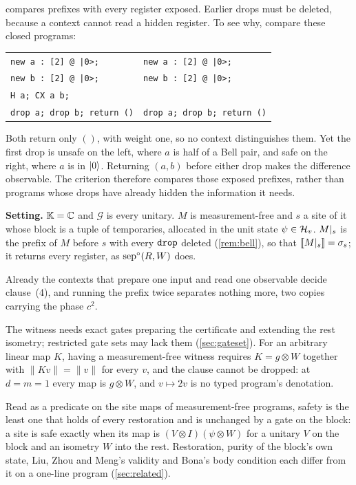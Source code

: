 \documentclass[acmsmall,screen,review,anonymous,nonacm]{acmart}
\begin{document}
\begin{remark}\label{rem:bell}
 compares prefixes with every register exposed.
Earlier drops must be deleted, because a context cannot read a hidden
register. To see why, compare these closed programs:
\begin{center}\small
\begin{tabular}{@{}l@{\qquad}l@{}}
\texttt{new a : [2] @ |0>;} & \texttt{new a : [2] @ |0>;}\\
\texttt{new b : [2] @ |0>;} & \texttt{new b : [2] @ |0>;}\\
\texttt{H a; CX a b;} & \\
\texttt{drop a; drop b; return ()} & \texttt{drop a; drop b; return ()}
\end{tabular}
\end{center}
Both return only $()$, with weight one, so no context distinguishes them.
Yet the first drop is unsafe on the left, where $a$ is half of a Bell
pair, and safe on the right, where $a$ is in $\lvert 0 \rangle$.
Returning $(a,b)$ before either drop makes the difference observable.
The criterion therefore compares those exposed prefixes, rather than
programs whose drops have already hidden the information it needs.
\end{remark}

\textbf{Setting.} $\mathbb{K} = \mathbb{C}$ and $\mathcal G$ is every unitary. $M$
is measurement-free and $s$ a site of it whose block is a tuple of
temporaries, allocated in the unit state $\psi \in \mathcal{H}_{v}$. $M|_{s}$ is the
prefix of $M$ before $s$ with every $\texttt{drop}$ deleted (\cref{rem:bell}), so that
$[\![M|_{s}]\!] = \sigma_s$; it returns every register, as
$\mathrm{sep}^{\circ}(R,W)$ does.

\stmtPhase

\stmtCriterion

Already the contexts that prepare one input and read one observable decide
clause~(4), and running the prefix twice separates nothing more, two copies
carrying the phase $c^{2}$.

The witness needs exact gates preparing the certificate and extending
the rest isometry; restricted gate sets may lack them (\cref{sec:gateset}).
For an arbitrary linear map $K$, having a measurement-free witness requires
$K = g \otimes W$ together
with $\|Kv\| = \|v\|$ for every $v$, and the clause cannot be dropped:
at $d = m = 1$ every map is $g \otimes W$, and $v \mapsto 2v$ is no
typed program's denotation.

Read as a predicate on the site maps of measurement-free programs,
safety is the least one that holds of every restoration and is unchanged by
a gate on the block: a site is safe exactly when its map is $(V \otimes
I)(\psi \otimes W)$ for a unitary $V$ on the block and an isometry $W$ into
the rest. Restoration, purity of the block's own state, Liu, Zhou and Meng's
validity and Bona's body condition each differ from it on a one-line
program (\cref{sec:related}).
\end{document}
